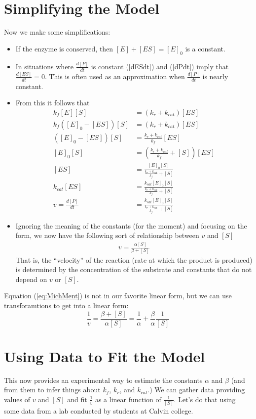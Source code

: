 \documentclass{article}\usepackage{graphicx, color}
\begin{document}
\section{Simplifying the Model}
Now we make some simplifications:
\begin{itemize}
	\item
		If the enzyme is conserved, then $[E] + [ES] = [E]_0$ is a constant.
	\item
In situations where $\frac{d[P]}{dt}$ is constant 
(\ref{dESdt}) and (\ref{dPdt}) imply that $\frac{d[ES]}{dt} = 0$.
This is often used as an approximation when $\frac{d[P]}{dt}$ 
is nearly constant.

\item
	From this it follows that 
	\begin{align*}
	k_f [E] [S] & = ( k_r + k_{cat} ) [ES] 
	\\
	k_f ([E]_0 - [ES]) [S] & = ( k_r + k_{cat} ) [ES] 
	\\
	([E]_0 - [ES]) [S] & =  \frac{k_r + k_{cat}}{k_f}  [ES] 
	\\
	[E]_0 [S] & = \left( \frac{k_r + k_{cat}}{k_f} + [S] \right)  [ES] 
	\\
	[ES] & = \frac{ [E]_0 [S] }{ \frac{k_r + k_{cat}}{k_f} + [S] }  
	\\
	k_{cat} [ES] & = \frac{k_{cat} [E]_0 [S]}{ \frac{k_r + k_{cat}}{k_f} + [S]}  
	\\
	v = \frac{d[P]}{dt}& = \frac{k_{cat} [E]_0 [S]}{\frac{k_r + k_{cat}}{k_f} + [S]}  
	\end{align*}
\item
	Ignoring the meaning of the constants (for the moment) 
	and focusing on the form, we now have 
	the following sort of relationship between $v$ and $[S]$
	\begin{align}
	v = \frac{ \alpha [S] }{ \beta + [S] }
	\label{eq:MichMent}
\end{align}
    That is, the ``velocity'' of the reaction (rate at which the product is produced)
	is determined by the concentration of the substrate and constants that do 
	not depend on $v$ or $[S]$.
\end{itemize}

Equation (\ref{eq:MichMent}) is not in our favorite linear form, but we can
use transforamtions to get into a linear form:
\[
\frac{1}v
= \frac {\beta + [S] }{ \alpha [S] } 
= \frac{1}{\alpha} + \frac{\beta}{\alpha} \frac{1}{[S]} 
\]

\section{Using Data to Fit the Model}
This now provides an experimental way to estimate the constants $\alpha$ and
$\beta$ (and from them to infer things about $k_{f}$, $k_r$, and $k_{cat}$.) We
can gather data providing values of $v$ and $[S]$ and fit $\frac{1}{v}$ as a 
linear function of $\frac{1}{[S]}$.
Let's do that using some data from a lab conducted by students at Calvin
college.
\end{document}

